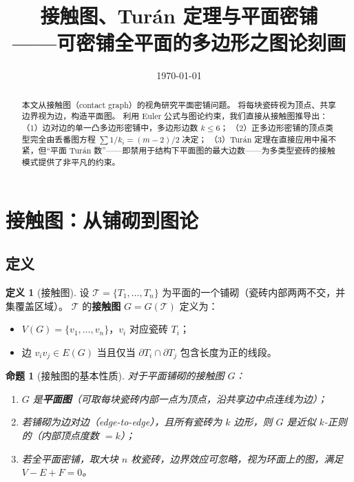 \documentclass[12pt,a4paper]{article}
\title{\bfseries 接触图、Tur\'an 定理与平面密铺\\[4pt]
\large ——可密铺全平面的多边形之图论刻画}
\author{}
\date{\today}
\theoremstyle{plain}
\newtheorem{proposition}[theorem]{命题}
\theoremstyle{definition}
\newtheorem{definition}[theorem]{定义}
\theoremstyle{remark}
\begin{document}
\maketitle

\begin{abstract}
本文从接触图（contact graph）的视角研究平面密铺问题。
将每块瓷砖视为顶点、共享边界视为边，构造平面图。
利用 Euler 公式与图论约束，我们直接从接触图推导出：
（1）边对边的单一凸多边形密铺中，多边形边数 $k \le 6$；
（2）正多边形密铺的顶点类型完全由丢番图方程 $\sum 1/k_i = (m-2)/2$ 决定；
（3）Tur\'an 定理在直接应用中虽不紧，但``平面 Tur\'an 数''——即禁用于结构下平面图的最大边数——为多类型瓷砖的接触模式提供了非平凡的约束。
\end{abstract}

\tableofcontents

\section{接触图：从铺砌到图论}

\subsection{定义}

\begin{definition}[接触图]
设 $\mathcal{T} = \{T_1, \dots, T_n\}$ 为平面的一个铺砌（瓷砖内部两两不交，并集覆盖区域）。
$\mathcal{T}$ 的\textbf{接触图} $G = G(\mathcal{T})$ 定义为：
\begin{itemize}
    \item $V(G) = \{v_1, \dots, v_n\}$，$v_i$ 对应瓷砖 $T_i$；
    \item 边 $v_i v_j \in E(G)$ 当且仅当 $\partial T_i \cap \partial T_j$ 包含长度为正的线段。
\end{itemize}
\end{definition}

\begin{proposition}[接触图的基本性质]\label{prop:basic}
对于平面铺砌的接触图 $G$：
\begin{enumerate}[label=(\roman*)]
    \item $G$ 是\textbf{平面图}（可取每块瓷砖内部一点为顶点，沿共享边中点连线为边）；
    \item 若铺砌为边对边（edge-to-edge），且所有瓷砖为 $k$ 边形，则 $G$ 是近似 $k$-正则的（内部顶点度数 $=k$）；
    \item 若全平面密铺，取大块 $n$ 枚瓷砖，边界效应可忽略，视为环面上的图，满足 $V - E + F = 0$。
\end{enumerate}
\end{proposition}
\end{document}
